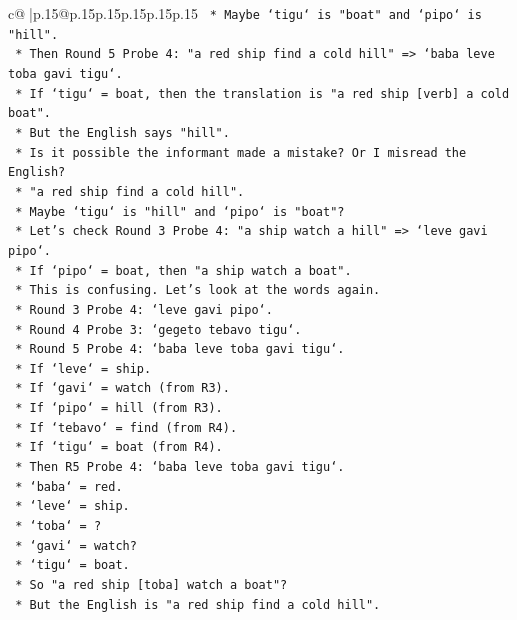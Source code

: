 \documentclass{article}
\begin{document}
{\begin{supertabular}{c@{$\;$}|p{.15\linewidth}@{}p{.15\linewidth}p{.15\linewidth}p{.15\linewidth}p{.15\linewidth}p{.15\linewidth}}
{{{\texttt{        *   Maybe `tigu` is "boat" and `pipo` is "hill".} \\
\texttt{        *   Then Round 5 Probe 4: "a red ship find a cold hill" => `baba leve toba gavi tigu`.} \\
\texttt{        *   If `tigu` = boat, then the translation is "a red ship {[}verb{]} a cold boat".} \\
\texttt{        *   But the English says "hill".} \\
\texttt{        *   Is it possible the informant made a mistake? Or I misread the English?} \\
\texttt{        *   "a red ship find a cold hill".} \\
\texttt{        *   Maybe `tigu` is "hill" and `pipo` is "boat"?} \\
\texttt{        *   Let's check Round 3 Probe 4: "a ship watch a hill" => `leve gavi pipo`.} \\
\texttt{        *   If `pipo` = boat, then "a ship watch a boat".} \\
\texttt{        *   This is confusing. Let's look at the words again.} \\
\texttt{        *   Round 3 Probe 4: `leve gavi pipo`.} \\
\texttt{        *   Round 4 Probe 3: `gegeto tebavo tigu`.} \\
\texttt{        *   Round 5 Probe 4: `baba leve toba gavi tigu`.} \\
\texttt{        *   If `leve` = ship.} \\
\texttt{        *   If `gavi` = watch (from R3).} \\
\texttt{        *   If `pipo` = hill (from R3).} \\
\texttt{        *   If `tebavo` = find (from R4).} \\
\texttt{        *   If `tigu` = boat (from R4).} \\
\texttt{        *   Then R5 Probe 4: `baba leve toba gavi tigu`.} \\
\texttt{        *   `baba` = red.} \\
\texttt{        *   `leve` = ship.} \\
\texttt{        *   `toba` = ?} \\
\texttt{        *   `gavi` = watch?} \\
\texttt{        *   `tigu` = boat.} \\
\texttt{        *   So "a red ship {[}toba{]} watch a boat"?} \\
\texttt{        *   But the English is "a red ship find a cold hill".} \\
}}}
\end{supertabular}}
\end{document}
